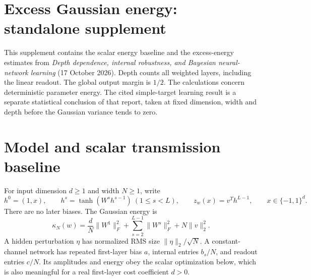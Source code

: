 \documentclass[11pt]{article}
\begin{document}
\section*{Excess Gaussian energy: standalone supplement}
This supplement contains the scalar energy baseline and the excess-energy
estimates from \emph{Depth dependence, internal robustness, and Bayesian
neural-network learning} (17 October 2026). Depth counts all weighted
layers, including the linear readout. The global output margin is $1/2$.
The calculations concern deterministic parameter energy. The cited
simple-target learning result is a separate statistical conclusion of
that report, taken at fixed dimension, width and depth before the
Gaussian variance tends to zero.
\section{Model and scalar transmission baseline}
For input dimension $d\ge1$ and width $N\ge1$, write
\[
 h^0=(1,x),\qquad h^s=\tanh(W^sh^{s-1})\ (1\le s<L),
 \qquad z_w(x)=v^Th^{L-1},\qquad x\in\{-1,1\}^d.
\]
There are no later biases. The Gaussian energy is
\[
 \kappa_N(w)=\frac dN\|W^1\|_F^2+
 \sum_{s=2}^{L-1}\|W^s\|_F^2+N\|v\|_2^2.
\]
A hidden perturbation $\eta$ has normalized RMS size
$\|\eta\|_2/\sqrt N$. A constant-channel network has repeated
first-layer bias $a$, internal entries $b_s/N$, and readout entries
$c/N$. Its amplitudes and energy obey the scalar optimization below,
which is also meaningful for a real first-layer cost coefficient $d>0$.


\end{document}
